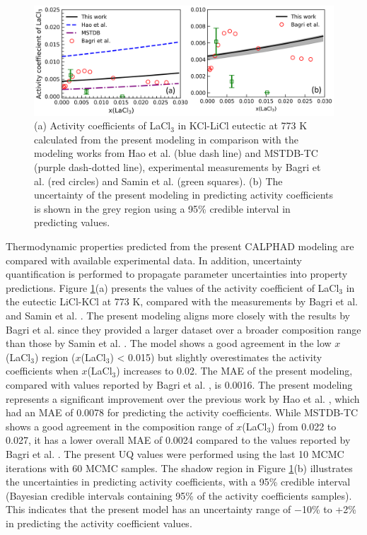 \begin{figure} [H]
    \centering
    \includegraphics[width=1\linewidth]{moltensalts/Moltensalts-LaCl3-Gamma-Ternary-UQ.png}
    \caption{(a) Activity coefficients of LaCl$_3$ in KCl-LiCl eutectic at 773 K calculated from the present modeling in comparison with the modeling works from Hao et al. \cite{hao2024thermodynamic} (blue dash line) and MSTDB-TC \cite{ard2022development} (purple dash-dotted line), experimental measurements by Bagri et al. \cite{bagri2016determination} (red circles) and Samin et al. \cite{samin2016estimation} (green squares). (b) The uncertainty of the present modeling in predicting activity coefficients is shown in the grey region using a 95\% credible interval in predicting values.}
    \label{ms:fig:lacl3ternaryGammaUQ}
\end{figure}

Thermodynamic properties predicted from the present CALPHAD modeling are compared with available experimental data. In addition, uncertainty quantification is performed to propagate parameter uncertainties into property predictions. Figure \ref{ms:fig:lacl3ternaryGammaUQ}(a) presents the values of the activity coefficient of LaCl$_3$ in the eutectic LiCl-KCl at 773 K, compared with the measurements by Bagri et al. \cite{bagri2016determination} and Samin et al. \cite{samin2016estimation}. The present modeling aligns more closely with the results by Bagri et al. \cite{bagri2016determination} since they provided a larger dataset over a broader composition range than those by Samin et al. \cite{samin2016estimation}. The model shows a good agreement in the low $x$(LaCl$_3$) region ($x$(LaCl$_3$) < 0.015) but slightly overestimates the activity coefficients when $x$(LaCl$_3$) increases to 0.02. The MAE of the present modeling, compared with values reported by Bagri et al. \cite{bagri2016determination}, is 0.0016. The present modeling represents a significant improvement over the previous work by Hao et al. \cite{hao2024thermodynamic}, which had an MAE of 0.0078 for predicting the activity coefficients. While MSTDB-TC \cite{ard2022development} shows a good agreement in the composition range of $x$(LaCl$_3$) from 0.022 to 0.027, it has a lower overall MAE of 0.0024 compared to the values reported by Bagri et al. \cite{bagri2016determination}. The present UQ values were performed using the last 10 MCMC iterations with 60 MCMC samples. The shadow region in Figure \ref{ms:fig:lacl3ternaryGammaUQ}(b) illustrates the uncertainties in predicting activity coefficients, with a 95\% credible interval (Bayesian credible intervals containing 95\% of the activity coefficients samples). This indicates that the present model has an uncertainty range of $-$10\% to +2\% in predicting the activity coefficient values.

